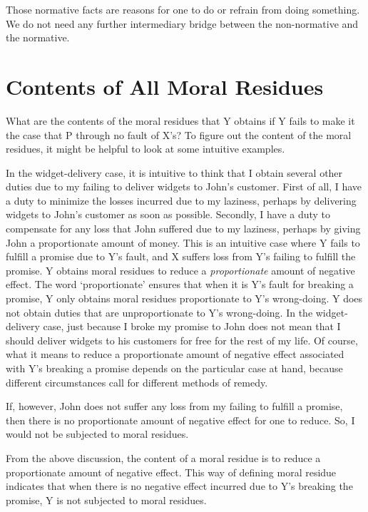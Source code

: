\noindent
Those normative facts are reasons for one to do or refrain from doing
something. We do not need any further intermediary bridge between the
non-normative and the normative.

\section{Contents of All Moral Residues}

What are the contents of the moral residues that Y obtains if Y fails to
make it the case that P through no fault of X's? To figure out the
content of the moral residues, it might be helpful to look at some
intuitive examples.

In the widget-delivery case, it is intuitive to think that I obtain
several other duties due to my failing to deliver widgets to John's
customer. First of all, I have a duty to minimize the losses incurred
due to my laziness, perhaps by delivering widgets to John's customer as
soon as possible. Secondly, I have a duty to compensate for any loss
that John suffered due to my laziness, perhaps by giving John a
proportionate amount of money. This is an intuitive case where Y fails
to fulfill a promise due to Y's fault, and X suffers loss from Y's
failing to fulfill the promise. Y obtains moral residues to reduce a
\emph{proportionate} amount of negative effect. The word `proportionate'
ensures that when it is Y's fault for breaking a promise, Y only obtains
moral residues proportionate to Y's wrong-doing. Y does not obtain
duties that are unproportionate to Y's wrong-doing. In the
widget-delivery case, just because I broke my promise to John does not
mean that I should deliver widgets to his customers for free for the
rest of my life. Of course, what it means to reduce a proportionate
amount of negative effect associated with Y's breaking a promise depends
on the particular case at hand, because different circumstances call for
different methods of remedy.

If, however, John does not suffer any loss from my failing to fulfill a
promise, then there is no proportionate amount of negative effect for
one to reduce. So, I would not be subjected to moral residues.

From the above discussion, the content of a moral residue is to reduce a
proportionate amount of negative effect. This way of defining
moral residue indicates that when there is no negative effect incurred
due to Y's breaking the promise, Y is not subjected to moral residues.

